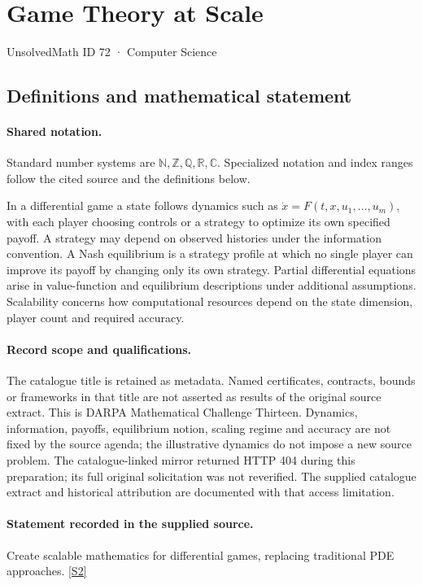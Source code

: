 \documentclass[11pt]{article}
\newcommand{\sref}[2]{\hyperlink{source:#1:#2}{[S#2]}}
\begin{document}
\setcounter{section}{71}
\section{Game Theory at Scale}\label{72}
{\small\sffamily UnsolvedMath ID 72 · Computer Science}
\subsection{Definitions and mathematical statement}

\paragraph{Shared notation.}Standard number systems are $\mathbb N,\mathbb Z,\mathbb Q,\mathbb R,\mathbb C$. Specialized notation and index ranges follow the cited source and the definitions below.


In a differential game a state follows dynamics such as $\dot x=F(t,x,u_1,\ldots,u_m)$, with each player choosing controls or a strategy to optimize its own specified payoff. A strategy may depend on observed histories under the information convention. A Nash equilibrium is a strategy profile at which no single player can improve its payoff by changing only its own strategy. Partial differential equations arise in value-function and equilibrium descriptions under additional assumptions. Scalability concerns how computational resources depend on the state dimension, player count and required accuracy.
\paragraph{Record scope and qualifications.}
The catalogue title is retained as metadata. Named certificates, contracts, bounds or frameworks in that title are not asserted as results of the original source extract.
This is DARPA Mathematical Challenge Thirteen. Dynamics, information, payoffs, equilibrium notion, scaling regime and accuracy are not fixed by the source agenda; the illustrative dynamics do not impose a new source problem. The catalogue-linked mirror returned HTTP 404 during this preparation; its full original solicitation was not reverified. The supplied catalogue extract and historical attribution are documented with that access limitation.
\paragraph{Statement recorded in the supplied source.}
Create scalable mathematics for differential games, replacing traditional PDE approaches. \sref{72}{2}
\end{document}
